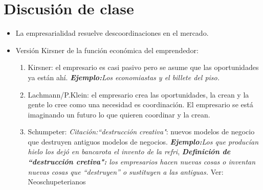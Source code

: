 \section{Discusión de clase}
\begin{itemize}
    \item La empresarialidad resuelve descoordinaciones en el mercado.
    \item Versión Kirsner de la función económica del emprendedor:
        \begin{enumerate}
            \item Kirsner: el empresario es casi pasivo pero se asume que las oportunidades ya están ahí. \emph{\textbf{Ejemplo:}Los economiastas y el billete del piso.}
            \item Lachmann/P.Klein: el empresario crea las oportunidades, la crean y la gente lo cree como una necesidad es coordinación. El empresario se está imaginando un futuro lo que quieren coordinar y la crean.
            \item Schumpeter: \emph{Citación:``destrucción creativa"}: nuevos modelos de negocio que destruyen antiguos modelos de negocios. \emph{\textbf{Ejemplo:}Los que producían hielo los dejó en bancarota el invento de la refri}, \emph{\textbf{Definición de ``destrucción cretiva":} los empresarios hacen nuevas cosas o inventan nuevas cosas que ``destruyen'' o sustituyen a las antiguas.} Ver: Neoschupeterianos
        \end{enumerate}
\end{itemize}


